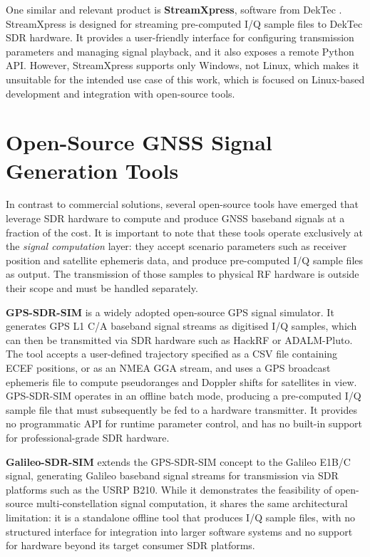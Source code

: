 One similar and relevant product is \textbf{StreamXpress}, software from
DekTec \cite{stream-xpress}. StreamXpress is designed for streaming
pre-computed \gls{I/Q} sample files to DekTec \gls{SDR} hardware. It provides
a user-friendly interface for configuring transmission parameters and managing
signal playback, and it also exposes a remote Python API. However,
StreamXpress supports only Windows, not Linux, which makes it unsuitable for
the intended use case of this work, which is focused on Linux-based
development and integration with open-source tools.

\section{Open-Source GNSS Signal Generation Tools}

In contrast to commercial solutions, several open-source tools have emerged
that leverage \gls{SDR} hardware to compute and produce \gls{GNSS} baseband
signals at a fraction of the cost. It is important to note that these tools
operate exclusively at the \emph{signal computation} layer: they accept
scenario parameters such as receiver position and satellite ephemeris data, and
produce pre-computed \gls{I/Q} sample files as output. The transmission of
those samples to physical \gls{RF} hardware is outside their scope and must be
handled separately.

\textbf{GPS-SDR-SIM} \cite{gpsSdrSim} is a widely adopted open-source \gls{GPS} signal simulator. It generates \gls{GPS} L1 C/A baseband signal streams as digitised \gls{I/Q} samples, which can then be transmitted via \gls{SDR} hardware such as HackRF or ADALM-Pluto. The tool accepts a user-defined trajectory specified as a CSV file containing \gls{ECEF} positions, or as an NMEA GGA stream, and uses a \gls{GPS} broadcast ephemeris file to compute pseudoranges and Doppler shifts for satellites in view. GPS-SDR-SIM operates in an offline batch mode, producing a pre-computed \gls{I/Q} sample file that must subsequently be fed to a hardware transmitter. It provides no programmatic API for runtime parameter control, and has no built-in support for professional-grade \gls{SDR} hardware.

\textbf{Galileo-SDR-SIM} \cite{galileoSdrSim} extends the GPS-SDR-SIM concept to the Galileo E1B/C signal, generating Galileo baseband signal streams for transmission via \gls{SDR} platforms such as the USRP B210. While it demonstrates the feasibility of open-source multi-constellation signal computation, it shares the same architectural limitation: it is a standalone offline tool that produces \gls{I/Q} sample files, with no structured interface for integration into larger software systems and no support for hardware beyond its target consumer \gls{SDR} platforms.

